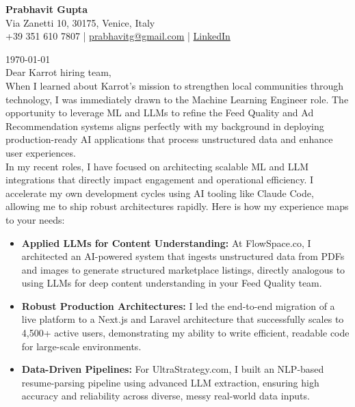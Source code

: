 \documentclass[11pt, a4paper]{article}
\begin{document}
\begin{center}
    {\Huge \textbf{Prabhavit Gupta}} \\ \vspace{4pt}
    Via Zanetti 10, 30175, Venice, Italy \\
    +39 351 610 7807 | \href{mailto:prabhavitg@gmail.com}{prabhavitg@gmail.com} | \href{https://www.linkedin.com/in/prabhavit/}{LinkedIn}
\end{center}

\vspace{24pt}
\noindent \today \\

\noindent Dear Karrot hiring team, \\

\noindent When I learned about Karrot's mission to strengthen local communities through technology, I was immediately drawn to the Machine Learning Engineer role. The opportunity to leverage ML and LLMs to refine the Feed Quality and Ad Recommendation systems aligns perfectly with my background in deploying production-ready AI applications that process unstructured data and enhance user experiences. \\

\noindent In my recent roles, I have focused on architecting scalable ML and LLM integrations that directly impact engagement and operational efficiency. I accelerate my own development cycles using AI tooling like Claude Code, allowing me to ship robust architectures rapidly. Here is how my experience maps to your needs:

\begin{itemize}
    \item \textbf{Applied LLMs for Content Understanding:} At FlowSpace.co, I architected an AI-powered system that ingests unstructured data from PDFs and images to generate structured marketplace listings, directly analogous to using LLMs for deep content understanding in your Feed Quality team.
    \item \textbf{Robust Production Architectures:} I led the end-to-end migration of a live platform to a Next.js and Laravel architecture that successfully scales to 4,500+ active users, demonstrating my ability to write efficient, readable code for large-scale environments.
    \item \textbf{Data-Driven Pipelines:} For UltraStrategy.com, I built an NLP-based resume-parsing pipeline using advanced LLM extraction, ensuring high accuracy and reliability across diverse, messy real-world data inputs.
\end{itemize}
\end{document}
